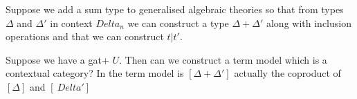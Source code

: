 \note Suppose we add a sum type to generalised algebraic theories so that from
types $\Delta$ and $\Delta'$ in context $Delta_n$ we can construct a type $\Delta + \Delta'$
along with inclusion operations and that we can construct $t | t'$. 

\note Suppose we have a gat+ $U$. Then can we construct a term model which is a contextual category?
In the term model is $[\Delta + \Delta']$ actually the coproduct of $[\Delta]$ and $[\
Delta'] $